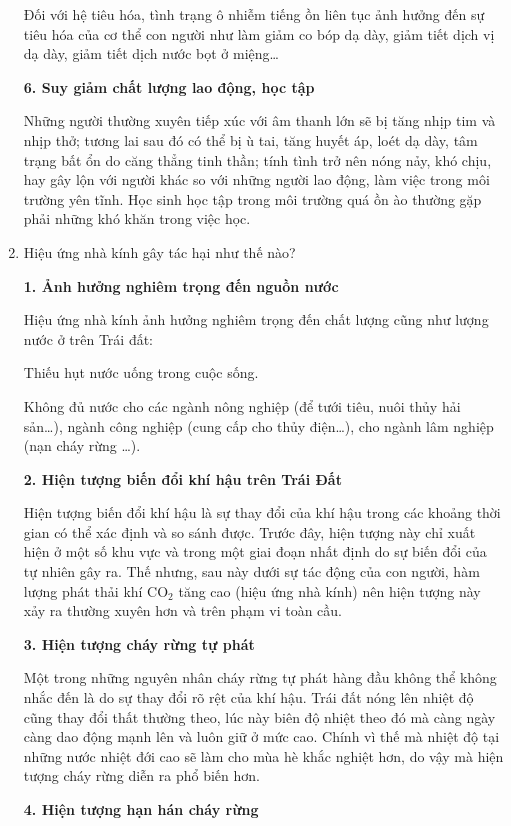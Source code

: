 \begin{enumerate}[label=\bfseries Câu \arabic*:]
{		Đối với hệ tiêu hóa, tình trạng ô nhiễm tiếng ồn liên tục ảnh hưởng đến sự tiêu hóa của cơ thể con người như làm giảm co bóp dạ dày, giảm tiết dịch vị dạ dày, giảm tiết dịch nước bọt ở miệng…
		
		\textbf{6. Suy giảm chất lượng lao động, học tập}
		
		Những người thường xuyên tiếp xúc với âm thanh lớn sẽ bị tăng nhịp tim và nhịp thở; tương lai sau đó có thể bị ù tai, tăng huyết áp, loét dạ dày, tâm trạng bất ổn do căng thẳng tinh thần; tính tình trở nên nóng nảy, khó chịu, hay gây lộn với người khác so với những người lao động, làm việc trong môi trường yên tĩnh. Học sinh học tập trong môi trường quá ồn ào thường gặp phải những khó khăn trong việc học.
	}
	\item {}
	
	
	{
		Hiệu ứng nhà kính gây tác hại như thế nào?
	}
	
	\hideall
	{
		\textbf{1. Ảnh hưởng nghiêm trọng đến nguồn nước}
		
		Hiệu ứng nhà kính ảnh hưởng nghiêm trọng đến chất lượng cũng như lượng nước ở trên Trái đất:
		
		Thiếu hụt nước uống trong cuộc sống.
		
		Không đủ nước cho các ngành nông nghiệp (để tưới tiêu, nuôi thủy hải sản…), ngành công nghiệp (cung cấp cho thủy điện…), cho ngành lâm nghiệp (nạn cháy rừng …).
		
		\textbf{2. Hiện tượng biến đổi khí hậu trên Trái Đất}
		
		Hiện tượng biến đổi khí hậu là sự thay đổi của khí hậu trong các khoảng thời gian có thể xác định và so sánh được. Trước đây, hiện tượng này chỉ xuất hiện ở một số khu vực và trong một giai đoạn nhất định do sự biến đổi của tự nhiên gây ra. Thế nhưng, sau này dưới sự tác động của con người, hàm lượng phát thải khí CO$_2$ tăng cao (hiệu ứng nhà kính) nên hiện tượng này xảy ra thường xuyên hơn và trên phạm vi toàn cầu.
		
		\textbf{3. Hiện tượng cháy rừng tự phát}
		
		Một trong những nguyên nhân cháy rừng tự phát hàng đầu không thể không nhắc đến là do sự thay đổi rõ rệt của khí hậu. Trái đất nóng lên nhiệt độ cũng thay đổi thất thường theo, lúc này biên độ nhiệt theo đó mà càng ngày càng dao động mạnh lên và luôn giữ ở mức cao. Chính vì thế mà nhiệt độ tại những nước nhiệt đới cao sẽ làm cho mùa hè khắc nghiệt hơn, do vậy mà hiện tượng cháy rừng diễn ra phổ biến hơn. 
		
		\textbf{4. Hiện tượng hạn hán cháy rừng}
		
}
\end{enumerate}
